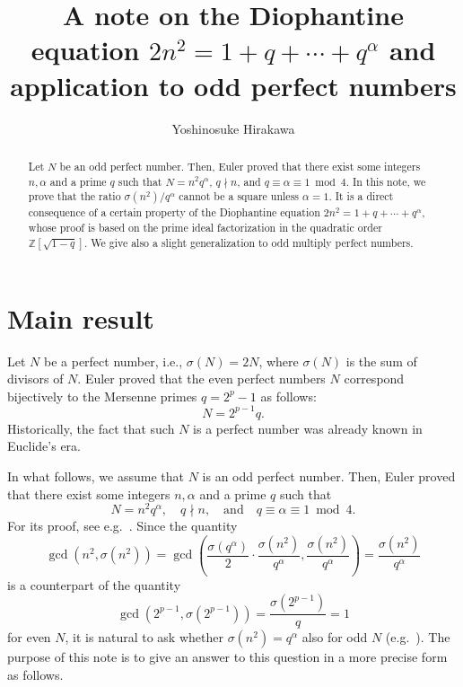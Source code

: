 \documentclass[11pt]{amsart}
\title{A note on the Diophantine equation $2n^{2} = 1+q+ \cdots +q^{\alpha}$ and application to odd perfect numbers}
\author{Yoshinosuke Hirakawa}
\theoremstyle{plain}
\theoremstyle{definition}
\begin{document}

\maketitle



\begin{abstract}
Let $N$ be an odd perfect number. Then, Euler proved that there exist some integers $n, \alpha$ and a prime $q$ such that $N = n^{2}q^{\alpha}$, $q \nmid n$, and $q \equiv \alpha \equiv 1 \bmod 4$.
In this note, we prove that the ratio $\sigma(n^{2})/q^{\alpha}$ cannot be a square unless $\alpha = 1$.
It is a direct consequence of a certain property of the Diophantine equation $2n^{2} = 1+q+ \cdots +q^{\alpha}$, whose proof is based on the prime ideal factorization in the quadratic order $\mathbb{Z}[\sqrt{1-q}]$. We give also a slight generalization to odd multiply perfect numbers.
\end{abstract}








\section{Main result}

Let $N$ be a perfect number,
i.e., $\sigma(N) = 2N$,
where $\sigma(N)$ is the sum of divisors of $N$.
Euler proved that
the even perfect numbers $N$ correspond bijectively to the Mersenne primes $q = 2^{p}-1$
as follows:
\[
	N
	= 2^{p-1}q.
\]
Historically, the fact that such $N$ is a perfect number was already known in Euclide's era.

In what follows,
we assume that $N$ is an odd perfect number.
Then, Euler proved that
there exist some integers $n, \alpha$ and a prime $q$ such that
\[
	N = n^{2}q^{\alpha},
	\quad q \nmid n,
	\quad \text{and}
	\quad q \equiv \alpha \equiv 1 \bmod 4.
\]
For its proof, see e.g.\ \cite[Theorem 2.2]{Chen-Luo}.
Since the quantity
\[
	\gcd(n^{2}, \sigma(n^{2}))
	= \gcd\left( \frac{\sigma(q^{\alpha})}{2} \cdot \frac{\sigma(n^{2})}{q^{\alpha}}, \frac{\sigma(n^{2})}{q^{\alpha}} \right)
	= \frac{\sigma(n^{2})}{q^{\alpha}}
\]
is a counterpart of the quantity
\[
	\gcd(2^{p-1}, \sigma(2^{p-1}))
	= \frac{\sigma(2^{p-1})}{q}
	= 1
\]
for even $N$,
it is natural to ask whether $\sigma(n^{2}) = q^{\alpha}$ also for odd $N$ (e.g.\ \cite{Suryanarayana}).
The purpose of this note is to give an answer to this question in a more precise form as follows.
\end{document}
